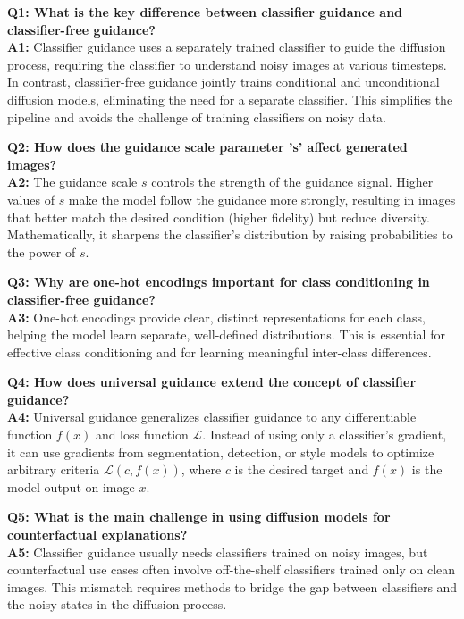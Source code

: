 \textbf{Q1: What is the key difference between classifier guidance and classifier-free guidance?}\\
\textbf{A1:} Classifier guidance uses a separately trained classifier to guide the diffusion process, requiring the classifier to understand noisy images at various timesteps. In contrast, classifier-free guidance jointly trains conditional and unconditional diffusion models, eliminating the need for a separate classifier. This simplifies the pipeline and avoids the challenge of training classifiers on noisy data.

\vspace{1em}
\textbf{Q2: How does the guidance scale parameter 's' affect generated images?}\\
\textbf{A2:} The guidance scale $s$ controls the strength of the guidance signal. Higher values of $s$ make the model follow the guidance more strongly, resulting in images that better match the desired condition (higher fidelity) but reduce diversity. Mathematically, it sharpens the classifier’s distribution by raising probabilities to the power of $s$.

\vspace{1em}
\textbf{Q3: Why are one-hot encodings important for class conditioning in classifier-free guidance?}\\
\textbf{A3:} One-hot encodings provide clear, distinct representations for each class, helping the model learn separate, well-defined distributions. This is essential for effective class conditioning and for learning meaningful inter-class differences.

\vspace{1em}
\textbf{Q4: How does universal guidance extend the concept of classifier guidance?}\\
\textbf{A4:} Universal guidance generalizes classifier guidance to any differentiable function $f(x)$ and loss function $\mathcal{L}$. Instead of using only a classifier’s gradient, it can use gradients from segmentation, detection, or style models to optimize arbitrary criteria $\mathcal{L}(c, f(x))$, where $c$ is the desired target and $f(x)$ is the model output on image $x$.

\vspace{1em}
\textbf{Q5: What is the main challenge in using diffusion models for counterfactual explanations?}\\
\textbf{A5:} Classifier guidance usually needs classifiers trained on noisy images, but counterfactual use cases often involve off-the-shelf classifiers trained only on clean images. This mismatch requires methods to bridge the gap between classifiers and the noisy states in the diffusion process.


